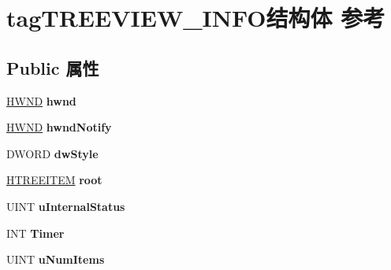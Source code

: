 \hypertarget{structtag_t_r_e_e_v_i_e_w___i_n_f_o}{}\section{tag\+T\+R\+E\+E\+V\+I\+E\+W\+\_\+\+I\+N\+F\+O结构体 参考}
\label{structtag_t_r_e_e_v_i_e_w___i_n_f_o}
\subsection*{Public 属性}
\begin{DoxyCompactItemize}
\item 
\mbox{\label{structtag_t_r_e_e_v_i_e_w___i_n_f_o_a5ee44aee990d98f70b7c8ac5be5873e0}} 
\hyperlink{interfacevoid}{H\+W\+ND} {\bfseries hwnd}
\item 
\mbox{\label{structtag_t_r_e_e_v_i_e_w___i_n_f_o_aebef8f9b68a0961c99963243c1f74cc8}} 
\hyperlink{interfacevoid}{H\+W\+ND} {\bfseries hwnd\+Notify}
\item 
\mbox{\label{structtag_t_r_e_e_v_i_e_w___i_n_f_o_afb28d6d04ce456fff134560b55b911ba}} 
D\+W\+O\+RD {\bfseries dw\+Style}
\item 
\mbox{\label{structtag_t_r_e_e_v_i_e_w___i_n_f_o_a7fd6c0fa0e7ae75db29ad8e5689205c9}} 
\hyperlink{struct___t_r_e_e_i_t_e_m}{H\+T\+R\+E\+E\+I\+T\+EM} {\bfseries root}
\item 
\mbox{\label{structtag_t_r_e_e_v_i_e_w___i_n_f_o_ade7679a7851eccc0d0ea15be5252c19b}} 
U\+I\+NT {\bfseries u\+Internal\+Status}
\item 
\mbox{\label{structtag_t_r_e_e_v_i_e_w___i_n_f_o_a53c20209dda114975901211661d63a0c}} 
I\+NT {\bfseries Timer}
\item 
\mbox{\label{structtag_t_r_e_e_v_i_e_w___i_n_f_o_a915e66e92dbb54cb610b5aeeaa22165e}} 
U\+I\+NT {\bfseries u\+Num\+Items}
\item 
\mbox{\label{structtag_t_r_e_e_v_i_e_w___i_n_f_o_a5ec4aca0f801eeae5bb137334da42cc8}} 

\end{DoxyCompactItemize}
